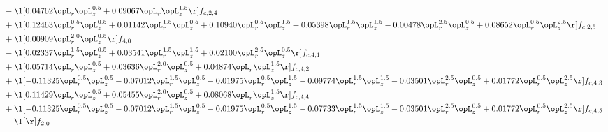 \begin{alignat}{2}
& - \l[  0.04762 \opL_r \opL_z^{0.5} +  0.09067 \opL_r \opL_z^{1.5}  \r] f_{c,2,4} \nonumber \\ 
& + \l[  0.12463 \opL_r^{0.5} \opL_z^{0.5} +  0.01142 \opL_r^{1.5} \opL_z^{0.5} +  0.10940 \opL_r^{0.5} \opL_z^{1.5} +  0.05398 \opL_r^{1.5} \opL_z^{1.5}   -0.00478 \opL_r^{2.5} \opL_z^{0.5} +  0.08652 \opL_r^{0.5} \opL_z^{2.5}  \r] f_{c,2,5} \nonumber \\ 
& + \l[  0.00909 \opL_r^{2.0} \opL_z^{0.5}  \r] f_{4,0} \nonumber \\ 
& - \l[  0.02337 \opL_r^{1.5} \opL_z^{0.5} +  0.03541 \opL_r^{1.5} \opL_z^{1.5} +  0.02100 \opL_r^{2.5} \opL_z^{0.5}  \r] f_{c,4,1} \nonumber \\ 
& + \l[  0.05714 \opL_r \opL_z^{0.5} +  0.03636 \opL_r^{2.0} \opL_z^{0.5} +  0.04874 \opL_r \opL_z^{1.5}  \r] f_{c,4,2} \nonumber \\ 
& + \l[  -0.11325 \opL_r^{0.5} \opL_z^{0.5}   -0.07012 \opL_r^{1.5} \opL_z^{0.5}   -0.01975 \opL_r^{0.5} \opL_z^{1.5}   -0.09774 \opL_r^{1.5} \opL_z^{1.5}   -0.03501 \opL_r^{2.5} \opL_z^{0.5} +  0.01772 \opL_r^{0.5} \opL_z^{2.5}  \r] f_{c,4,3} \nonumber \\ 
& + \l[  0.11429 \opL_r \opL_z^{0.5} +  0.05455 \opL_r^{2.0} \opL_z^{0.5} +  0.08068 \opL_r \opL_z^{1.5}  \r] f_{c,4,4} \nonumber \\ 
& + \l[  -0.11325 \opL_r^{0.5} \opL_z^{0.5}   -0.07012 \opL_r^{1.5} \opL_z^{0.5}   -0.01975 \opL_r^{0.5} \opL_z^{1.5}   -0.07733 \opL_r^{1.5} \opL_z^{1.5}   -0.03501 \opL_r^{2.5} \opL_z^{0.5} +  0.01772 \opL_r^{0.5} \opL_z^{2.5}  \r] f_{c,4,5} \nonumber \\ 
& - \l[  \r] f_{2,0} \nonumber \\ 
\end{alignat} 


